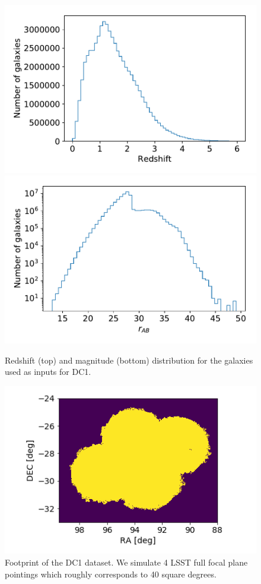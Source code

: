 \documentclass[\docopts]{\docclass}
\begin{document}
\begin{figure}
\centering
\includegraphics[width=0.9\columnwidth]{N_z_DC1.pdf}
\includegraphics[width=0.9\columnwidth]{N_m_DC1.pdf}
\caption{Redshift (top) and magnitude (bottom) distribution for the galaxies used as inputs for DC1.}
\label{fig:catalog_plots}
\end{figure}

\begin{figure}
\centering
\includegraphics[width=0.9\columnwidth]{footprint.png}
\caption{Footprint of the DC1 dataset. We simulate 4 LSST full focal plane pointings which roughly corresponds to 40 square degrees.}
\label{fig:footprint}
\end{figure}
\end{document}
